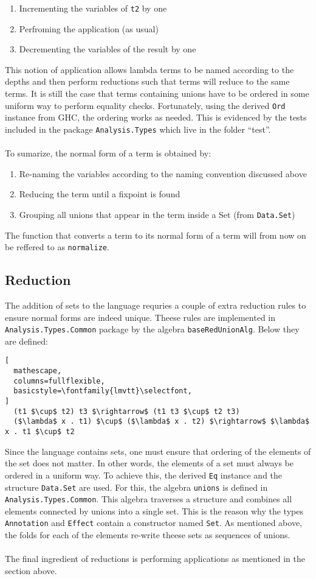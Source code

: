 \documentclass[8pt]{extarticle}
\begin{document}
\begin{enumerate}
\item Incrementing the variables of \verb+t2+ by one
\item Perfroming the application (as usual)
\item Decrementing the variables of the result by one
\end{enumerate}
This notion of application allows lambda terms to be named according to the depths and then perform reductions such that terms will reduce to the same terms. It is still the case that terms containing unions have to be ordered in some uniform way to perform equality checks. Fortunately, using the derived \verb+Ord+ instance from GHC, the ordering works as needed. This is evidenced by the tests included in the package \verb+Analysis.Types+ which live in the folder ``test''.
\\\\
To sumarize, the normal form of a term is obtained by:
\begin{enumerate}
\item Re-naming the variables according to the naming convention discussed above
\item Reducing the term until a fixpoint is found
\item Grouping all unions that appear in the term inside a Set (from \verb+Data.Set+)
\end{enumerate}
The function that converts a term to its normal form of a term will from now on be reffered to as \verb+normalize+.
\subsection{Reduction}
The addition of sets to the language requries a couple of extra reduction rules to ensure normal forms are indeed unique. Theese rules are implemented in \verb+Analysis.Types.Common+ package by the algebra \verb+baseRedUnionAlg+. Below they are defined:
\begin{lstlisting}[
  mathescape,
  columns=fullflexible,
  basicstyle=\fontfamily{lmvtt}\selectfont,
]
  (t1 $\cup$ t2) t3 $\rightarrow$ (t1 t3 $\cup$ t2 t3)
  ($\lambda$ x . t1) $\cup$ ($\lambda$ x . t2) $\rightarrow$ $\lambda$ x . t1 $\cup$ t2
\end{lstlisting}
Since the language contains sets, one must ensure that ordering of the elements of the set does not matter. In other words, the elements of a set must always be ordered in a uniform way. To achieve this, the derived \verb+Eq+ instance and the structure \verb+Data.Set+ are used. For this, the algebra \verb+unions+ is defined in \verb+Analysis.Types.Common+. This algebra traverses a structure and combines all elements connected by unions into a single set. This is the reason why the types \verb+Annotation+ and \verb+Effect+ contain a constructor named \verb+Set+. As mentioned above, the folds for each of the elements re-write theese sets as sequences of unions.
\\\\
The final ingredient of reductions is performing applications as mentioned in the section above.
\\\\
\end{document}
